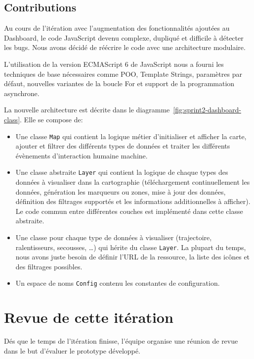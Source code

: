 \subsection{Contributions}

Au cours de l'itération avec l'augmentation des fonctionnalités ajoutées au
Dashboard, le code JavaScript devenu complexe, dupliqué et difficile à détecter
les bugs. Nous avons décidé de réécrire le code avec une architecture modulaire.

L'utilisation de la version ECMAScript 6 de JavaScript nous a fourni les
techniques de base nécessaires comme POO, Template Strings, paramètres par
défaut, nouvelles variantes de la boucle For et support de la programmation
asynchrone.

La nouvelle architecture est décrite dans le
diagramme~\ref{fig:sprint2-dashboard-class}. Elle se compose de:

\begin{itemize}
    \item Une classe \verb|Map| qui contient la logique métier d'initialiser et
        afficher la carte, ajouter et filtrer des différents types de données
        et traiter les différents évènements d'interaction humaine machine.
    \item Une classe abstraite \verb|Layer| qui contient la logique de
        chaque types des données à visualiser dans la cartographie (téléchargement
        continuellement les données, génération les marqueurs ou zones, mise à
        jour des données, définition des filtrages supportés et les
        informations additionnelles à afficher). Le code commun entre
        différentes couches est implémenté dans cette classe abstraite.
    \item Une classe pour chaque type de données à visualiser (trajectoire,
        ralentisseurs, secousses, \ldots) qui hérite du classe \verb|Layer|. La
        plupart du temps, nous avons juste besoin de définir l'URL de la
        ressource, la liste des icônes et des filtrages possibles.
    \item Un espace de noms \verb|Config| contenu les constantes de
        configuration.
\end{itemize}

\section{Revue de cette itération}

Dés que le temps de l'itération finisse, l'équipe organise une réunion de revue
dans le but d'évaluer le prototype développé.

